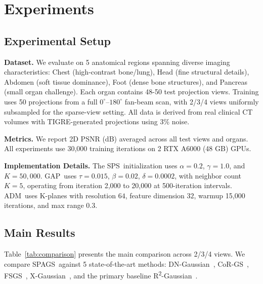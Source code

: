 \documentclass{egPublStyle}
\newcommand{\spags}{SPAGS}
\newcommand{\sps}{SPS}
\newcommand{\gap}{GAP}
\newcommand{\adm}{ADM}
\newcommand{\rtwo}{R\textsuperscript{2}-Gaussian}
\begin{document}
\section{Experiments}
\label{sec:experiments}

\subsection{Experimental Setup}
\label{sec:setup}

\textbf{Dataset.} We evaluate on 5 anatomical regions spanning diverse imaging characteristics: Chest (high-contrast bone/lung), Head (fine structural details), Abdomen (soft tissue dominance), Foot (dense bone structures), and Pancreas (small organ challenge). Each organ contains 48-50 test projection views. Training uses 50 projections from a full $0^\circ$--$180^\circ$ fan-beam scan, with 2/3/4 views uniformly subsampled for the sparse-view setting. All data is derived from real clinical CT volumes with TIGRE-generated projections using 3\% noise.

\textbf{Metrics.} We report 2D PSNR (dB) averaged across all test views and organs. All experiments use 30,000 training iterations on 2 RTX A6000 (48 GB) GPUs.

\textbf{Implementation Details.} The \sps\ initialization uses $\alpha=0.2$, $\gamma=1.0$, and $K=50{,}000$. \gap\ uses $\tau=0.015$, $\beta=0.02$, $\delta=0.0002$, with neighbor count $K=5$, operating from iteration 2,000 to 20,000 at 500-iteration intervals. \adm\ uses K-planes with resolution $64$, feature dimension $32$, warmup 15,000 iterations, and max range $0.3$.

\subsection{Main Results}
\label{sec:comparison}

Table~\ref{tab:comparison} presents the main comparison across 2/3/4 views. We compare \spags\ against 5 state-of-the-art methods: DN-Gaussian~\cite{li2024dn}, CoR-GS~\cite{zhang2024cor}, FSGS~\cite{zhu2024fsgs}, X-Gaussian~\cite{cai2024xgaussian}, and the primary baseline \rtwo\ \cite{hu2024r2}.
\end{document}
